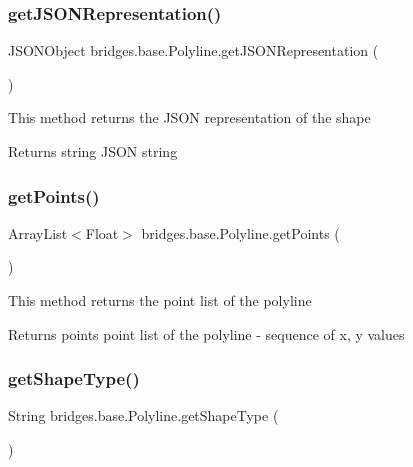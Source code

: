 \subsubsection{\texorpdfstring{get\+J\+S\+O\+N\+Representation()}{getJSONRepresentation()}}
{\footnotesize\ttfamily J\+S\+O\+N\+Object bridges.\+base.\+Polyline.\+get\+J\+S\+O\+N\+Representation (\begin{DoxyParamCaption}{ }\end{DoxyParamCaption})}

This method returns the J\+S\+ON representation of the shape

\begin{DoxyReturn}{Returns}
string J\+S\+ON string 
\end{DoxyReturn}
\mbox{\label{classbridges_1_1base_1_1_polyline_ae610d680975558db90a06949991583f8}} 
\subsubsection{\texorpdfstring{get\+Points()}{getPoints()}}
{\footnotesize\ttfamily Array\+List$<$Float$>$ bridges.\+base.\+Polyline.\+get\+Points (\begin{DoxyParamCaption}{ }\end{DoxyParamCaption})}

This method returns the point list of the polyline

\begin{DoxyReturn}{Returns}
points point list of the polyline -\/ sequence of x, y values 
\end{DoxyReturn}
\mbox{\label{classbridges_1_1base_1_1_polyline_a75a5dceac8fe1f1266a676467db10aea}} 
\subsubsection{\texorpdfstring{get\+Shape\+Type()}{getShapeType()}}
{\footnotesize\ttfamily String bridges.\+base.\+Polyline.\+get\+Shape\+Type (\begin{DoxyParamCaption}{ }\end{DoxyParamCaption})}

